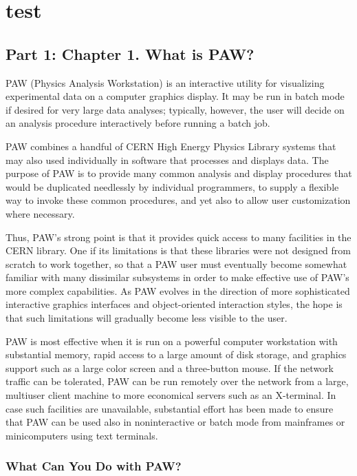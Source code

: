 \setlongtables
{}

\chapter{test}
\section{Part 1: Chapter 1.  What is PAW?}
 
PAW (Physics Analysis Workstation) is an interactive
utility for visualizing experimental data on a computer
graphics display.  It may be run in batch mode if desired
for very large data analyses; typically, however, the user
will decide on an analysis procedure interactively before
running a batch job.
 
PAW combines a handful of CERN High Energy Physics Library systems
that may also used individually in software that
processes and displays data.  The purpose of PAW is
to provide many common analysis and display
procedures that would be duplicated needlessly
by individual programmers, to supply a flexible way to invoke these
common procedures, and yet also to allow user customization where
necessary.
 
Thus, PAW's strong point is that it provides quick access to many
facilities in the CERN library.  One if its limitations is that these
libraries were not designed from scratch to work together, so that a
PAW user must eventually become somewhat familiar with many dissimilar
subsystems in order to make effective use of PAW's more complex
capabilities.  As PAW evolves in the direction of more sophisticated
interactive graphics interfaces and object-oriented interaction
styles, the hope is that such limitations will gradually become less
visible to the user.
 
PAW is most effective when it is run on a powerful computer
workstation with substantial memory, rapid access to a large amount of
disk storage, and graphics support such as a large color screen and a
three-button mouse.  If the network traffic can be tolerated, PAW can
be run remotely over the network from a large, multiuser client
machine to more economical servers such as an X-terminal.  In case such
facilities are unavailable, substantial effort has been made to ensure
that PAW can be used also in noninteractive or batch mode from mainframes
or minicomputers  using text terminals.
 
\subsection{What Can You Do with PAW?}
 
